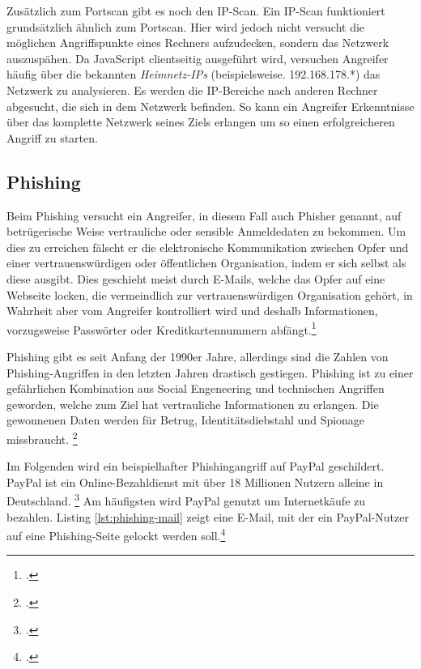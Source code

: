Zusätzlich zum Portscan gibt es noch den IP-Scan. Ein IP-Scan funktioniert grundsätzlich ähnlich
zum Portscan. Hier wird jedoch nicht versucht die möglichen Angriffspunkte eines Rechners
aufzudecken, sondern das Netzwerk auszuspähen. Da JavaScript clientseitig ausgeführt wird, versuchen
Angreifer häufig über die bekannten \textit{Heimnetz-IPs} (beispielsweise. 192.168.178.*) das
Netzwerk zu analysieren. Es werden die IP-Bereiche nach anderen Rechner abgesucht, die sich in dem
Netzwerk befinden. So kann ein Angreifer Erkenntnisse über das komplette Netzwerk seines Ziels
erlangen um so einen erfolgreicheren Angriff zu starten.

\subsection{Phishing}

Beim Phishing versucht ein Angreifer, in diesem Fall auch Phisher genannt, auf betrügerische Weise
vertrauliche oder sensible Anmeldedaten zu bekommen. Um dies zu erreichen fälscht er die
elektronische Kommunikation zwischen Opfer und einer vertrauenswürdigen oder öffentlichen
Organisation, indem er sich selbst als diese ausgibt. Dies geschieht meist durch E-Mails, welche
das Opfer auf eine Webseite locken, die vermeindlich zur vertrauenswürdigen Organisation gehört,
in Wahrheit aber vom Angreifer kontrolliert wird und deshalb Informationen, vorzugsweise Passwörter
oder Kreditkartennummern abfängt.\footcite[Vgl.][1]{phishing}

Phishing gibt es seit Anfang der 1990er Jahre, allerdings sind die Zahlen von Phishing-Angriffen in
den letzten Jahren drastisch gestiegen. Phishing ist zu einer gefährlichen Kombination aus Social
Engeneering und technischen Angriffen geworden, welche zum Ziel hat vertrauliche Informationen zu
erlangen. Die gewonnenen Daten werden für Betrug, Identitätsdiebstahl und Spionage missbraucht.
\footcite[Vgl.][1\psq]{phishing}

Im Folgenden wird ein beispielhafter Phishingangriff auf PayPal geschildert. PayPal ist ein
Online-Bezahldienst mit über 18 Millionen Nutzern alleine in Deutschland. \footcite[Vgl.][]{paypal}
Am häufigsten wird PayPal genutzt um Internetkäufe zu bezahlen. Listing \ref{lst:phishing-mail}
zeigt eine E-Mail, mit der ein PayPal-Nutzer auf eine Phishing-Seite gelockt werden
soll.\footcite[Vgl.][10]{phishing}

\newpage


